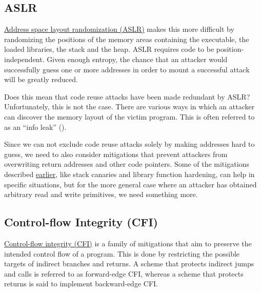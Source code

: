 \documentclass[
  a4paper,
]{report}
\begin{document}
\subsection{ASLR}\label{aslr}

\href{https://en.wikipedia.org/wiki/Address_space_layout_randomization}{\label{__index_entry_30}{Address
space layout randomization
(ASLR)}} makes this
more difficult by randomizing the positions of the memory areas
containing the executable, the loaded libraries, the stack and the heap.
ASLR requires code to be position-independent. Given enough entropy, the
chance that an attacker would successfully guess one or more addresses
in order to mount a successful attack will be greatly reduced.

Does this mean that code reuse attacks have been made redundant by ASLR?
Unfortunately, this is not the case. There are various ways in which an
attacker can discover the memory layout of the victim program. This is
often referred to as an ``\label{__index_entry_31}{info
leak}'' ().

Since we can not exclude code reuse attacks solely by making addresses
hard to guess, we need to also consider mitigations that prevent
attackers from overwriting return addresses and other code pointers.
Some of the mitigations described
\hyperref[stack-buffer-overflows]{earlier}, like stack canaries and
library function hardening, can help in specific situations, but for the
more general case where an attacker has obtained arbitrary read and
write primitives, we need something more.

\subsection{Control-flow Integrity
(CFI)}\label{control-flow-integrity-cfi}

\href{https://en.wikipedia.org/wiki/Control-flow_integrity}{\label{__index_entry_32}{Control-flow
integrity (CFI)}} is a family of
mitigations that aim to preserve the intended control flow of a program.
This is done by restricting the possible targets of indirect branches
and returns. A scheme that protects indirect jumps and calls is referred
to as \label{__index_entry_33}{forward-edge
CFI}, whereas a scheme that protects returns is
said to implement \label{__index_entry_34}{backward-edge
CFI}.
\end{document}
